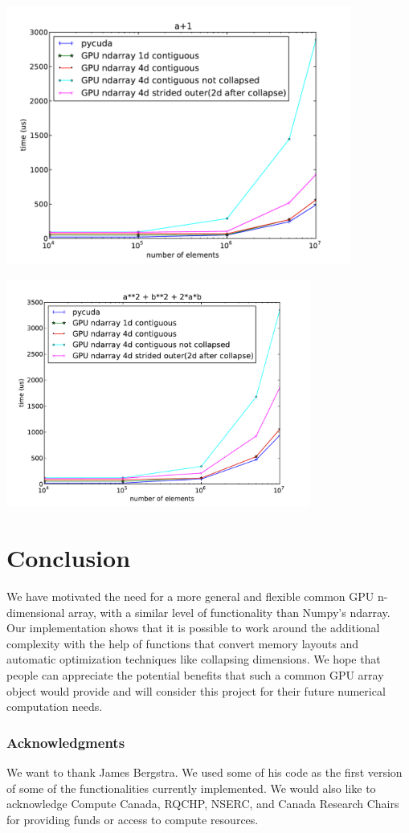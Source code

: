 \documentclass{article} %
\begin{document}
\begin{center}
\includegraphics[width=0.85\textwidth]{ap1_no_alloc}

\includegraphics[width=0.75\textwidth]{a2pb2p2ab_no_alloc}
\end{center}


\section{Conclusion}

We have motivated the need for a more general and flexible common GPU n-dimensional array, with a similar level of functionality than Numpy's ndarray.
Our implementation shows that it is possible to work around the additional complexity with the help of functions that convert memory layouts and automatic optimization techniques like collapsing dimensions.
We hope that people can appreciate the potential benefits that such a common GPU array object would provide and will consider this project for their future numerical computation needs.

\subsubsection*{Acknowledgments}

We want to thank James Bergstra. We used some of his code as the first version of some of the functionalities currently implemented. We would also like to acknowledge Compute Canada, RQCHP, NSERC, and Canada Research Chairs for providing funds or access to compute resources.




\end{document}
